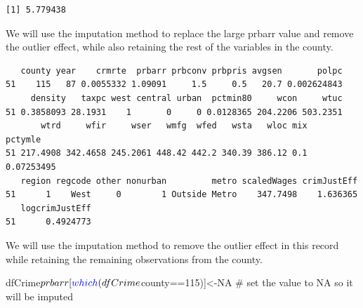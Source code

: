\documentclass[]{article}
\newenvironment{Shaded}{}{}
\newcommand{\CommentTok}[1]{\textcolor[rgb]{0.00,0.50,0.00}{#1}}
\newcommand{\DecValTok}[1]{#1}
\newcommand{\KeywordTok}[1]{\textcolor[rgb]{0.00,0.00,1.00}{#1}}
\newcommand{\NormalTok}[1]{#1}
\newcommand{\OperatorTok}[1]{#1}
\newcommand{\OtherTok}[1]{\textcolor[rgb]{1.00,0.25,0.00}{#1}}
\newcommand{\StringTok}[1]{\textcolor[rgb]{0.00,0.50,0.50}{#1}}
\begin{document}
\begin{verbatim}
[1] 5.779438
\end{verbatim}

We will use the imputation method to replace the large prbarr value and
remove the outlier effect, while also retaining the rest of the
variables in the county.

\begin{Shaded}
\end{Shaded}

\begin{verbatim}
   county year    crmrte  prbarr prbconv prbpris avgsen       polpc
51    115   87 0.0055332 1.09091     1.5     0.5   20.7 0.002624843
     density   taxpc west central urban  pctmin80     wcon     wtuc
51 0.3858093 28.1931    1       0     0 0.0128365 204.2206 503.2351
       wtrd     wfir     wser   wmfg  wfed   wsta   wloc mix    pctymle
51 217.4908 342.4658 245.2061 448.42 442.2 340.39 386.12 0.1 0.07253495
   region regcode other nonurban         metro scaledWages crimJustEff
51      1    West     0        1 Outside Metro    347.7498    1.636365
   logcrimJustEff
51      0.4924773
\end{verbatim}

We will use the imputation method to remove the outlier effect in this
record while retaining the remaining observations from the county.

\begin{Shaded}
\begin{Highlighting}[]
\NormalTok{dfCrime}\OperatorTok{$}\NormalTok{prbarr[}\KeywordTok{which}\NormalTok{(dfCrime}\OperatorTok{$}\NormalTok{county}\OperatorTok{==}\DecValTok{115}\NormalTok{)]<-}\OtherTok{NA} \CommentTok{# set the value to NA so it will be imputed}
\end{Highlighting}
\end{Shaded}
\end{document}
